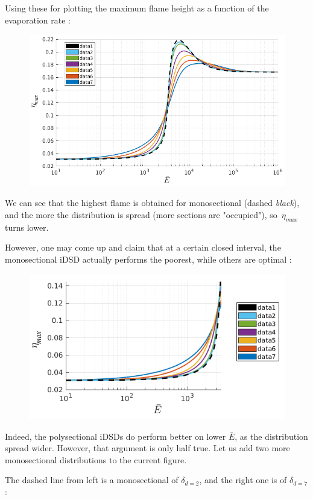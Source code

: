 \documentclass[12pt]{article}
\numberwithin{equation}{section}
\begin{document}
\begin{flushleft}
\newpage

Using these for plotting the maximum flame height as a function of the evaporation rate :
\begin{figure}[H]
\centering
\includegraphics[width=0.85  \linewidth, center]{multi_graph_07a.png}
\end{figure}
We can see that the highest flame is obtained for monosectional (dashed \textit{black}), and the more the distribution is spread (more sections are "occupied"), so \,$\eta_{max}$ turns lower. 

However, one may come up and claim that at a certain closed interval, the monosectional iDSD actually performs the poorest, while others are optimal :
\begin{figure}[H]
\centering
\includegraphics[width=0.63  \linewidth, center]{multi_graph_07b.png}
\end{figure}
Indeed, the polysectional iDSDs do perform better on lower $\bar{E}$, as the distribution spread wider. However, that argument is only half true. Let us add two more monosectional distributions to the current figure. 

The dashed line from left is a monosectional of $\delta_{d=2}$, and the right one is of $\delta_{d=7}$ :


\end{flushleft}
\end{document}
